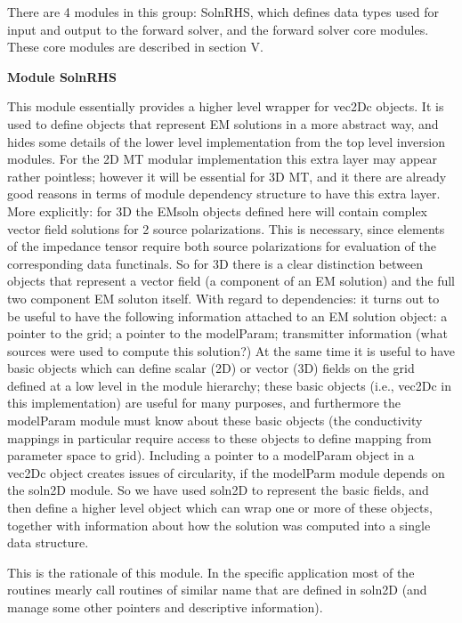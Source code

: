 \documentclass[12pt]{article}
\begin{document}
There are 4 modules in this group: SolnRHS, which defines data types
used for input and output to the forward solver, and the forward
solver core modules.  These core modules are described in section V.

\vspace{10pt}

\noindent
{\bf Module SolnRHS}

This module essentially provides a higher level wrapper for 
vec2Dc objects.  It is used to define objects that represent 
EM solutions in a more abstract way, and hides some details
of the lower level implementation from the top level inversion
modules.  For the 2D MT modular implementation this extra
layer may appear rather pointless; however it will be essential
for 3D MT, and it there are already good reasons in terms of module
dependency structure to have this extra layer.  More explicitly:
for 3D the EMsoln objects defined here will contain complex
vector field solutions for 2 source polarizations.  This is
necessary, since elements of the impedance tensor require both
source polarizations for evaluation of the corresponding data
functinals.  So for 3D there is a clear distinction between
objects that represent a vector field (a component of an EM solution)
and the full two component EM soluton itself.  With regard to
dependencies: it turns out to be useful to have the following
information attached to an EM solution object: a pointer to the
grid; a pointer to the modelParam; transmitter information (what
sources were used to compute this solution?)  At the same time it
is useful to have basic objects which can define scalar (2D) or vector
(3D) fields on the grid defined at a low level in the module 
hierarchy; these basic objects (i.e., vec2Dc in this implementation)
are useful for many purposes, and furthermore the modelParam module 
must know about these basic objects (the conductivity mappings in 
particular require access to these objects to define mapping
from parameter space to grid).  Including a pointer
to a modelParam object in a vec2Dc object creates issues of
circularity, if the modelParm module depends on the soln2D module.
So we have used soln2D to represent the basic fields, and then
define a higher level object which can wrap one or more of these
objects, together with information about how the solution was computed
into a single data structure.

This is the rationale of this module.  In the specific application
most of the routines mearly call routines of similar name that
are defined in soln2D (and manage some other pointers and descriptive
information).
\end{document}
